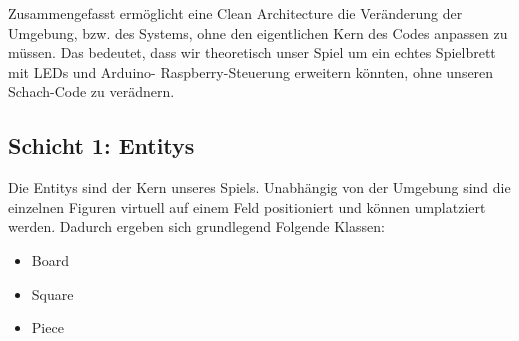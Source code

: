 \documentclass{article}
\begin{document}
Zusammengefasst ermöglicht eine Clean Architecture die Veränderung der Umgebung, bzw. des Systems, ohne den eigentlichen Kern des Codes anpassen zu müssen.
Das bedeutet, dass wir theoretisch unser Spiel um ein echtes Spielbrett mit LEDs und Arduino- Raspberry-Steuerung erweitern könnten, ohne unseren Schach-Code zu verädnern.

\subsection{Schicht 1: Entitys}
Die Entitys sind der Kern unseres Spiels. Unabhängig von der Umgebung sind die einzelnen Figuren virtuell auf einem Feld positioniert und können umplatziert werden.
Dadurch ergeben sich grundlegend Folgende Klassen: 

\begin{center}
	\begin{itemize}
		\item Board
		\item Square
		\item Piece
	\end{itemize}
\end{center}
\end{document}
